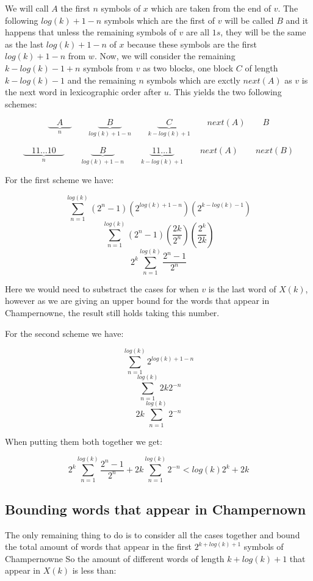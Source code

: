 \documentclass[10pt, a4paper]{article}
\theoremstyle{definition}
\begin{document}
We will call $A$ the first $n$ symbols of $x$ which are taken from the end of $v$. The following $log(k) + 1 - n$ symbols which are the first of $v$ will be called $B$ and it happens that unless the remaining symbols of $v$ are all $1s$, 
they will be the same as the last $log(k) + 1 - n$ of $x$ because these symbols are the first $log(k) + 1 - n$ from $w$.
Now, we will consider the remaining $k - log(k) - 1 + n$ symbols from $v$ as two blocks, one block $C$ of length $k - log(k) - 1$ and the remaining $n$ symbols which are exctly $next(A)$ as $v$ is the next word in lexicographic order after $u$.
This yields the two following schemes:

$$\underbrace{\quad A \quad }_{n} \qquad \underbrace{\quad B \quad }_{log(k) + 1 - n}  \qquad \underbrace{\quad C \quad }_{k-log(k)+1} \qquad next(A) \qquad B$$

$$\underbrace{\quad 11\dots10 \quad }_{n} \qquad \underbrace{\quad B \quad }_{log(k) + 1 - n}  \qquad \underbrace{\; 11\dots1 \; }_{k-log(k)+1} \qquad next(A) \qquad next(B)$$

For the first scheme we have:

$$\sum_{n=1}^{log(k)}(2^n - 1) (2^{log(k) + 1 - n}) (2^{k - log(k) - 1})$$
$$\sum_{n=1}^{log(k)}(2^n - 1) (\frac{2k}{2^n})     (\frac{2^k}{2k})$$
$$ 2^k \sum_{n=1}^{log(k)} \frac{2^n - 1}{2^n} $$

Here we would need to substract the cases for when $v$ is the last word of $X(k)$, however as we are giving an upper bound for the words that appear in Champernowne, the result still holds taking this number.

For the second scheme we have:

$$ \sum_{n=1}^{log(k)} 2^{log(k) + 1 - n}$$
$$ \sum_{n=1}^{log(k)} 2k2^{- n}$$
$$ 2k\sum_{n=1}^{log(k)} 2^{- n}$$

When putting them both together we get:

$$  2^k \sum_{n=1}^{log(k)} \frac{2^n - 1}{2^n}  + 2k\sum_{n=1}^{log(k)} 2^{- n} < log(k)2^k + 2k$$

\subsection{Bounding words that appear in Champernown}

The only remaining thing to do is to consider all the cases together and bound the total amount of words that appear in the first $2^{k + log(k) + 1}$ symbols of Champernowne
So the amount of different words of length $k + log(k) + 1$ that appear in $X(k)$ is less than:
\end{document}
